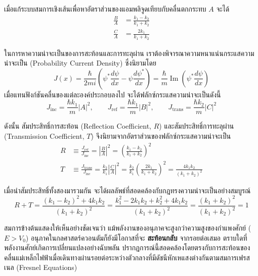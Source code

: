 เมื่อแก้ระบบสมการเชิงเส้นเพื่อหาอัตราส่วนของแอมพลิจูดเทียบกับคลื่นตกกระทบ $A$ จะได้
\begin{align}
\frac{B}{A} &= \frac{k_1 - k_2}{k_1 + k_2} \label{eq_step_refl_amp} \\
\frac{C}{A} &= \frac{2k_1}{k_1 + k_2} \label{eq_step_trans_amp}
\end{align}

ในการหาความน่าจะเป็นของการสะท้อนและการทะลุผ่าน เราต้องพิจารณาความหนาแน่นกระแสความน่าจะเป็น (Probability Current Density) ซึ่งนิยามโดย
\begin{equation}
J(x) = \frac{\hbar}{2mi} \left( \psi^* \frac{d\psi}{dx} - \psi \frac{d\psi^*}{dx} \right) = \frac{\hbar}{m} \operatorname{Im}\left(\psi^* \frac{d\psi}{dx}\right)
\end{equation}
เมื่อแทนฟังก์ชันคลื่นของแต่ละองค์ประกอบลงไป จะได้ฟลักซ์กระแสความน่าจะเป็นดังนี้
\begin{equation}
J_{\text{inc}} = \frac{\hbar k_1}{m} |A|^2, \qquad J_{\text{ref}} = \frac{\hbar k_1}{m} |B|^2, \qquad J_{\text{trans}} = \frac{\hbar k_2}{m} |C|^2
\end{equation}

ดังนั้น สัมประสิทธิ์การสะท้อน (Reflection Coefficient, $R$) และสัมประสิทธิ์การทะลุผ่าน (Transmission Coefficient, $T$) จึงนิยามจากอัตราส่วนของฟลักซ์กระแสความน่าจะเป็น
\begin{align}
R &\equiv \frac{J_{\text{ref}}}{J_{\text{inc}}} = \left| \frac{B}{A} \right|^2 = \left( \frac{k_1 - k_2}{k_1 + k_2} \right)^2 \label{eq_step_refl_coeff} \\
T &\equiv \frac{J_{\text{trans}}}{J_{\text{inc}}} = \frac{k_2}{k_1} \left| \frac{C}{A} \right|^2 = \frac{k_2}{k_1} \left( \frac{2k_1}{k_1 + k_2} \right)^2 = \frac{4k_1 k_2}{(k_1 + k_2)^2} \label{eq_step_trans_coeff}
\end{align}

เมื่อนำสัมประสิทธิ์ทั้งสองมารวมกัน จะได้ผลลัพธ์ที่สอดคล้องกับกฎทรงความน่าจะเป็นอย่างสมบูรณ์
\begin{equation}
R + T = \frac{(k_1 - k_2)^2 + 4k_1 k_2}{(k_1 + k_2)^2} = \frac{k_1^2 - 2k_1 k_2 + k_2^2 + 4k_1 k_2}{(k_1 + k_2)^2} = \frac{(k_1 + k_2)^2}{(k_1 + k_2)^2} = 1
\end{equation}

สมการข้างต้นแสดงให้เห็นอย่างชัดเจนว่า แม้พลังงานของอนุภาคจะสูงกว่าความสูงของกำแพงศักย์ ($E > V_0$) อนุภาคในกลศาสตร์ควอนตัมก็ยังมีโอกาสที่จะ \textbf{สะท้อนกลับ} จากรอยต่อเสมอ ตราบใดที่พลังงานศักย์เกิดการเปลี่ยนแปลงอย่างฉับพลัน ปรากฏการณ์นี้สอดคล้องโดยตรงกับการสะท้อนของคลื่นแม่เหล็กไฟฟ้าเมื่อเดินทางผ่านรอยต่อระหว่างตัวกลางที่มีดัชนีหักเหแสงต่างกันตามสมการเฟรสเนล (Fresnel Equations)

